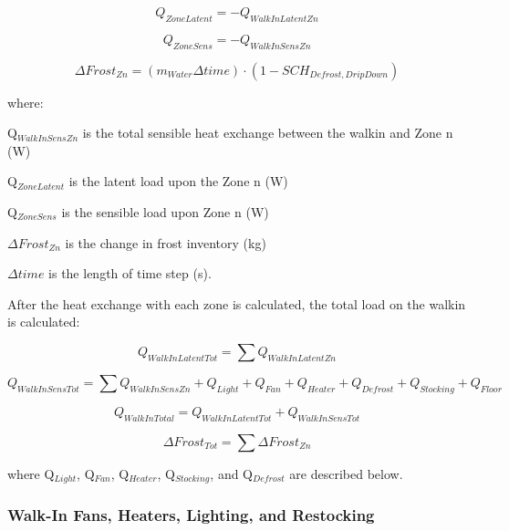 \begin{equation}
Q_{ZoneLatent} = - Q_{WalkInLatentZn}
\end{equation}

\begin{equation}
Q_{ZoneSens} = - Q_{WalkInSensZn}
\end{equation}

\begin{equation}
\Delta Frost_{Zn} = (m_{Water} \Delta time) \cdot (1- SCH_{Defrost,DripDown})
\end{equation}

where:

Q\(_{WalkInSensZn}\) is the total sensible heat exchange between the walkin and Zone n (W)

Q\(_{ZoneLatent}\) is the latent load upon the Zone n (W)

Q\(_{ZoneSens}\) is the sensible load upon Zone n (W)

\(\Delta Frost_{Zn}\) is the change in frost inventory (kg)

\(\Delta time\) is the length of time step (s).

After the heat exchange with each zone is calculated, the total load on the walkin is calculated:

\begin{equation}
Q_{WalkInLatentTot} = \sum Q_{WalkInLatentZn}
\end{equation}

\begin{equation}
Q_{WalkInSensTot} = \sum Q_{WalkInSensZn} + Q_{Light} + Q_{Fan} + Q_{Heater} + Q_{Defrost} + Q_{Stocking} + Q_{Floor}
\end{equation}

\begin{equation}
Q_{WalkInTotal} = Q_{WalkInLatentTot} + Q_{WalkInSensTot}
\end{equation}

\begin{equation}
\Delta Frost_{Tot} = \sum \Delta Frost_{Zn}
\end{equation}

where Q\(_{Light}\), Q\(_{Fan}\), Q\(_{Heater}\), Q\(_{Stocking}\), and Q\(_{Defrost}\) are described below.

\subsubsection{Walk-In Fans, Heaters, Lighting, and Restocking}\label{walk-in-fans-heaters-lighting-and-restocking}

